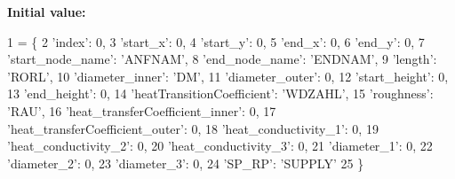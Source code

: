 {\bfseries Initial value\+:}
\begin{DoxyCode}
1 =  \{
2                                 \textcolor{stringliteral}{'index'}: 0,
3                                 \textcolor{stringliteral}{'start\_x'}: 0,
4                                 \textcolor{stringliteral}{'start\_y'}: 0,
5                                 \textcolor{stringliteral}{'end\_x'}: 0,
6                                 \textcolor{stringliteral}{'end\_y'}: 0,
7                                 \textcolor{stringliteral}{'start\_node\_name'}: \textcolor{stringliteral}{'ANFNAM'},
8                                 \textcolor{stringliteral}{'end\_node\_name'}: \textcolor{stringliteral}{'ENDNAM'},
9                                 \textcolor{stringliteral}{'length'}: \textcolor{stringliteral}{'RORL'},
10                                 \textcolor{stringliteral}{'diameter\_inner'}: \textcolor{stringliteral}{'DM'},
11                                 \textcolor{stringliteral}{'diameter\_outer'}: 0,
12                                 \textcolor{stringliteral}{'start\_height'}: 0,
13                                 \textcolor{stringliteral}{'end\_height'}: 0,
14                                 \textcolor{stringliteral}{'heatTransitionCoefficient'}: \textcolor{stringliteral}{'WDZAHL'},
15                                 \textcolor{stringliteral}{'roughness'}: \textcolor{stringliteral}{'RAU'},
16                                 \textcolor{stringliteral}{'heat\_transferCoefficient\_inner'}: 0,
17                                 \textcolor{stringliteral}{'heat\_transferCoefficient\_outer'}: 0,
18                                 \textcolor{stringliteral}{'heat\_conductivity\_1'}: 0,
19                                 \textcolor{stringliteral}{'heat\_conductivity\_2'}: 0,
20                                 \textcolor{stringliteral}{'heat\_conductivity\_3'}: 0,
21                                 \textcolor{stringliteral}{'diameter\_1'}: 0,
22                                 \textcolor{stringliteral}{'diameter\_2'}: 0,
23                                 \textcolor{stringliteral}{'diameter\_3'}: 0,
24                                 \textcolor{stringliteral}{'SP\_RP'}: \textcolor{stringliteral}{'SUPPLY'}
25                                 \}
\end{DoxyCode}
\mbox{\label{namespace_dictionary_a87613937e78bcf53500a014dfffc9bef}} 
